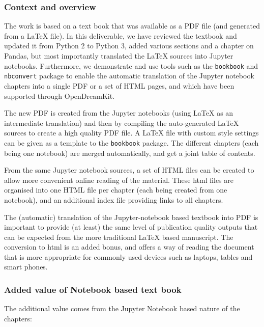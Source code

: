\documentclass{deliverablereport}
\begin{document}
\subsubsection{Context and overview}

The work is based on a text book that was available as a PDF file (and
generated from a \LaTeX{} file). In this deliverable, we have reviewed
the textbook and updated it from Python 2 to Python 3, added various
sections and a chapter on Pandas, but most importantly translated the
\LaTeX{} sources into Jupyter notebooks. Furthermore, we demonstrate and
use tools such as the \texttt{bookbook} and \texttt{nbconvert}
package to enable the automatic translation of the Jupyter notebook
chapters into a single PDF or a set of HTML pages, and which have been
supported through OpenDreamKit. 

The new PDF is created from the Jupyter notebooks (using LaTeX as an
intermediate translation) and then by compiling the auto-generated
LaTeX sources to create a high quality PDF file. A LaTeX file with
custom style settings can be given as a template to the
\texttt{bookbook} package. The different chapters (each being one
notebook) are merged automatically, and get a joint table of contents.

From the same Jupyter notebook sources, a set of HTML files can be
created to allow more convenient online reading of the material. These
html files are organised into one HTML file per chapter (each being
created from one notebook), and an additional index file providing
links to all chapters.

The (automatic) translation of the Jupyter-notebook based textbook
into PDF is important to provide (at least) the same level of
publication quality outputs that can be expected from the more
traditional LaTeX based manuscript. The conversion to html is an added
bonus, and offers a way of reading the document that is more
appropriate for commonly used devices such as laptops, tables and
smart phones.

\subsubsection{Added value of Notebook based text book}

The additional value comes from the Jupyter Notebook based
nature of the chapters:
\end{document}
